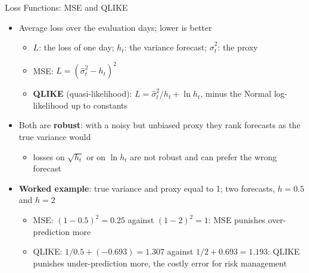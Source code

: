 \begin{frame}{Loss Functions: MSE and QLIKE}
\itemsize{\small}
\begin{itemize}
    \item Average loss over the evaluation days; lower is better 
    \begin{itemize}
        \item $L$: the loss of one day; $h_t$: the variance forecast; $\hat\sigma_t^2$: the proxy
        \item MSE: $L = (\hat\sigma_t^2 - h_t)^2$
        \item \textbf{QLIKE} (quasi-likelihood): $L = \hat\sigma_t^2/h_t + \ln h_t$, minus the Normal log-likelihood up to constants
    \end{itemize}
    \item Both are \textbf{robust}: with a noisy but unbiased proxy they rank forecasts as the true variance would
    \begin{itemize}
        \item losses on $\sqrt{h_t}$ or on $\ln h_t$ are not robust and can prefer the wrong forecast
    \end{itemize}
    \item \textbf{Worked example}: true variance and proxy equal to 1; two forecasts, $h = 0.5$ and $h = 2$
    \begin{itemize}
        \item MSE: $(1 - 0.5)^2 = 0.25$ against $(1 - 2)^2 = 1$: MSE punishes over-prediction more
        \item QLIKE: $1/0.5 + (-0.693) = 1.307$ against $1/2 + 0.693 = 1.193$: QLIKE punishes under-prediction more, the costly error for risk management
    \end{itemize}
\end{itemize}
\end{frame}

